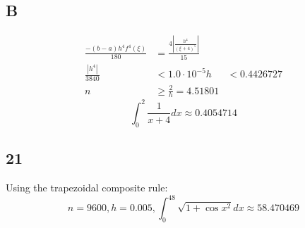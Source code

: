 \documentclass{oisinclass}
\begin{document}
\subsection*{B}
\begin{align*}
	\frac{-(b - a) h^4 f^4(\xi)}{180} & = \frac{4 \left|{\frac{h^{4}}{\left(\xi + 4\right)^{5}}}\right|}{15} \\
	\frac{\left|{h^{4}}\right|}{3840} & < 1.0 \cdot 10^{-5}
	h                                 & < 0.4426727                                                          \\
	n                                 & \geq \frac{2}{h} = 4.51801
\end{align*}
\[
	\int_{0}^{2}\frac{1}{x+4}dx \approx 0.4054714
\]

\subsection*{21}
Using the trapezoidal composite rule:
\[
	n = 9600, h = 0.005, \int_{0}^{48}\sqrt{1 + \cos{x}^2}dx \approx 58.470469
\]
\end{document}
